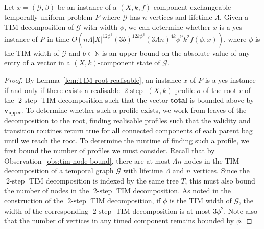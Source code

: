 \documentclass[a4paper,UKenglish,cleveref, autoref, thm-restate]{lipics-v2021} %
\DeclareMathOperator{\twostep}{2-step}
\begin{document}
\begin{theoremrep}\label{thm:component-temp-unif}
    Let $x=(\mathcal{G},\beta)$ be an instance of a $(X,k,f)$-component-exchangeable temporally uniform problem $P$ where $\mathcal{G}$ has $n$ vertices and lifetime $\Lambda$.
    Given a TIM decomposition of $\mathcal{G}$ with width $\phi$, we
    can determine whether $x$ is a yes-instance of $P$ in time 
    $O\left(n \Lambda |X|^{12 \phi^3} (3b)^{12k \phi^3} (3\Lambda n )^{4k}\phi^9 k^2 f(\phi,x)\right)$, 
    where $\phi$ is the TIM width of $\mathcal{G}$ and $b \in \mathbb{N}$ is an upper bound on the absolute value of any entry of a vector in a $(X,k)$-component state of $\mathcal{G}$.
\end{theoremrep}
\begin{proof}
    By Lemma~\ref{lem:TIM-root-realisable}, an instance $x$ of $P$ is a yes-instance if and only if there exists a realisable $\twostep$ $(X,k)$ profile $\sigma$ of the root $r$ of the $\twostep$ TIM decomposition such that the vector \textbf{total} is bounded above by $\textbf{v}_{\text{upper}}$. To determine whether such a profile exists, we work from leaves of the decomposition to the root, finding realisable profiles such that the validity and transition routines return true for all connected components of each parent bag until we reach the root. To determine the runtime of finding such a profile, we first bound the number of profiles we must consider. Recall that by Observation~\ref{obs:tim-node-bound}, there are at most $\Lambda n$ nodes in the TIM decomposition of a temporal graph $\mathcal{G}$ with lifetime $\Lambda$ and $n$ vertices. Since the $\twostep$ TIM decomposition is indexed by the same tree $T$, this must also bound the number of nodes in the $\twostep$ TIM decomposition. As noted in the construction of the $\twostep$ TIM decomposition, if $\phi$ is the TIM width of $\mathcal{G}$, the width of the corresponding $\twostep$ TIM decomposition is at most $3\phi^2$.  Note also that the number of vertices in any timed component remains bounded by $\phi$.


\end{proof}
\end{document}
